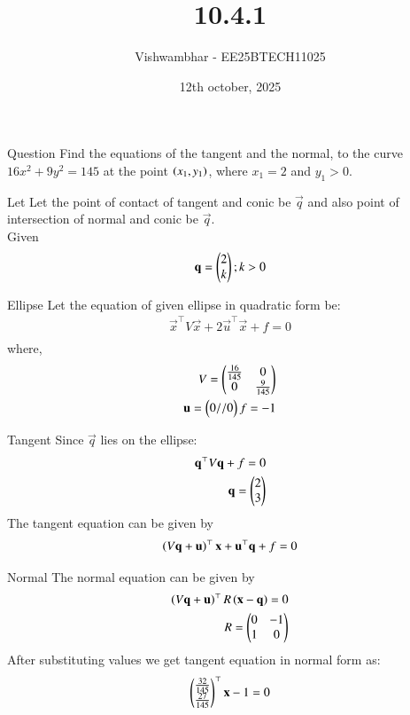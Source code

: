 \documentclass{beamer}
\title{10.4.1}
\date{12th october, 2025}
\author{Vishwambhar - EE25BTECH11025}
\begin{document}
\frame{\titlepage}
\begin{frame}{Question}
Find the equations of the tangent and the normal, to the curve $16x^2+9y^2=145$ at the point $\left(x_1,y_1\right)$, where $x_1=2$ and $y_1>0$.\\
\end{frame}

\begin{frame}{Let}
Let the point of contact of tangent and conic be $\vec{q}$ and also point of intersection of normal and conic be $\vec{q}$.\\
Given
\begin{align}
    \mathbf{q}=\begin{pmatrix}2\\k\end{pmatrix};k>0
\end{align}
\end{frame}

\begin{frame}{Ellipse}
Let the equation of given ellipse in quadratic form be:
\begin{align}
    \vec{x}^\top V\vec{x}+2\vec{u}^\top\vec{x}+f=0\\
\end{align}
where,
\begin{align}
    V=\begin{pmatrix}\frac{16}{145}&0\\0&\frac{9}{145}\end{pmatrix}\\
    \mathbf{u} = \begin{pmatrix}0//0\end{pmatrix}
    f=-1
\end{align}
\end{frame}

\begin{frame}{Tangent}
Since $\vec{q}$ lies on the ellipse:
\begin{align}
    \mathbf{q}^\top V\mathbf{q}+f=0\\
    \mathbf{q} = \begin{pmatrix}2\\3\end{pmatrix}
\end{align}
The tangent equation can be given by
\begin{align}
    \left(V\mathbf{q}+\mathbf{u}\right)^\top\mathbf{x}+\mathbf{u}^\top\mathbf{q}+f=0
\end{align}
\end{frame}

\begin{frame}{Normal}
The normal equation can be given by
\begin{align}
    \left(V\mathbf{q}+\mathbf{u}\right)^\top R\left(\mathbf{x}-\mathbf{q}\right)=0\\
    R=\begin{pmatrix}0&-1\\1&0\end{pmatrix}
\end{align}
After substituting values we get tangent equation in normal form as:
\begin{align}
    \begin{pmatrix}\frac{32}{145}\\\frac{27}{145}\end{pmatrix}^\top\mathbf{x}-1=0
\end{align}
\end{frame}
\end{document}
